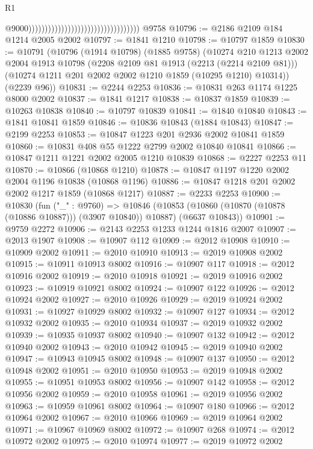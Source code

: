 \begin{lexlean}{R1}
\begin{coremodule}
                                                                        @9000))))))))))))))))))))))))))))))))))
    @9758
@10796 := @2186 @2109 @184 @1214 @2005 @2002
@10797 := @1841 @1210
@10798 := @10797 @1859
@10830 := @10791
    (@10796
      (@1914 @10798)
      (@1885 @9758)
      (@10274
        @210
        @1213
        @2002
        @2004
        @1913
        @10798
        (@2208 @2109 @81 @1913 (@2213 (@2214 @2109 @81)))
        (@10274 @1211 @201 @2002 @2002 @1210 @1859 (@10295 @1210) @10314))
      (@2239 @96))
@10831 := @2244 @2253
@10836 := @10831 @263 @1174 @1225 @8000 @2002
@10837 := @1841 @1217
@10838 := @10837 @1859
@10839 := @10263 @10838
@10840 := @10797 @10839
@10841 := @1840 @10840
@10843 := @1841 @10841 @1859
@10846 := @10836 @10843 (@1884 @10843)
@10847 := @2199 @2253
@10853 := @10847 @1223 @201 @2936 @2002 @10841 @1859
@10860 := @10831 @408 @55 @1222 @2799 @2002 @10840 @10841
@10866 := @10847 @1211 @1221 @2002 @2005 @1210 @10839
@10868 := @2227 @2253 @11
@10870 := @10866 (@10868 @1210)
@10878 := @10847 @1197 @1220 @2002 @2004 @1196 @10838 (@10868 @1196)
@10886 := @10847 @1218 @201 @2002 @2002 @1217 @1859 (@10868 @1217)
@10887 := @2233 @2253
@10900 := @10830
    (fun ("_" : @9760) =>
    @10846 (@10853 (@10860 (@10870 (@10878 (@10886 @10887))) (@3907 @10840)) @10887) (@6637 @10843))
@10901 := @9759 @2272
@10906 := @2143 @2253 @1233 @1244 @1816 @2007
@10907 := @2013 @1907
@10908 := @10907 @112
@10909 := @2012 @10908
@10910 := @10909 @2002
@10911 := @2010 @10910
@10913 := @2019 @10908 @2002
@10915 := @10911 @10913 @8002
@10916 := @10907 @117
@10918 := @2012 @10916 @2002
@10919 := @2010 @10918
@10921 := @2019 @10916 @2002
@10923 := @10919 @10921 @8002
@10924 := @10907 @122
@10926 := @2012 @10924 @2002
@10927 := @2010 @10926
@10929 := @2019 @10924 @2002
@10931 := @10927 @10929 @8002
@10932 := @10907 @127
@10934 := @2012 @10932 @2002
@10935 := @2010 @10934
@10937 := @2019 @10932 @2002
@10939 := @10935 @10937 @8002
@10940 := @10907 @132
@10942 := @2012 @10940 @2002
@10943 := @2010 @10942
@10945 := @2019 @10940 @2002
@10947 := @10943 @10945 @8002
@10948 := @10907 @137
@10950 := @2012 @10948 @2002
@10951 := @2010 @10950
@10953 := @2019 @10948 @2002
@10955 := @10951 @10953 @8002
@10956 := @10907 @142
@10958 := @2012 @10956 @2002
@10959 := @2010 @10958
@10961 := @2019 @10956 @2002
@10963 := @10959 @10961 @8002
@10964 := @10907 @180
@10966 := @2012 @10964 @2002
@10967 := @2010 @10966
@10969 := @2019 @10964 @2002
@10971 := @10967 @10969 @8002
@10972 := @10907 @268
@10974 := @2012 @10972 @2002
@10975 := @2010 @10974
@10977 := @2019 @10972 @2002

\end{coremodule}
\end{lexlean}

